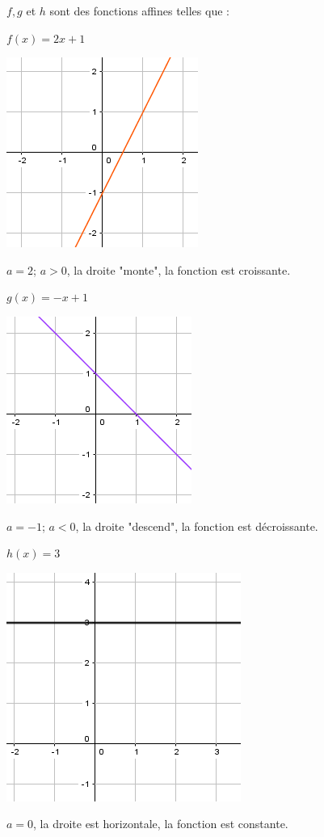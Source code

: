 \documentclass[12pt,a4paper]{article}
\begin{document}
\begin{myexs}
	$f, g$ et $h$ sont des fonctions affines telles que :
	
	\begin{multicols}{3}
		\begin{center}
			$f(x)=2x+1$
			
			\includegraphics[scale=0.6]{ex2_1}
			
			$a=2$; $a>0$, la droite "monte", la fonction est croissante. 
		\end{center}
		
		\begin{center}
			$g(x)=-x+1$
			
			\includegraphics[scale=0.6]{ex2_2}
			
			$a=-1$; $a<0$, la droite "descend", la fonction est décroissante. 
		\end{center}
			
		\begin{center}
			$h(x)=3$
				
				
			\includegraphics[scale=0.57]{ex2_3}
				
			$a=0$, la droite est horizontale, la fonction est constante. 
		\end{center}
	\end{multicols}
\end{myexs}
\end{document}
